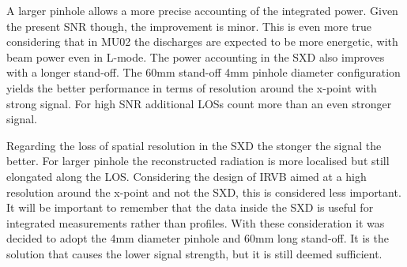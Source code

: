 A larger pinhole allows a more precise accounting of the integrated power. Given the present SNR though, the improvement is minor. This is even more true considering that in MU02 the discharges are expected to be more energetic, with beam power even in L-mode. The power accounting in the SXD also improves with a longer stand-off.
The 60mm stand-off 4mm pinhole diameter configuration yields the better performance in terms of resolution around the x-point with strong signal. For high SNR additional LOSs count more than an even stronger signal.

Regarding the loss of spatial resolution in the SXD the stonger the signal the better. For larger pinhole the reconstructed radiation is more localised but still elongated along the LOS. Considering the design of IRVB aimed at a high resolution around the x-point and not the SXD, this is considered less important. It will be important to remember that the data inside the SXD is useful for integrated measurements rather than profiles.
With these consideration it was decided to adopt the 4mm diameter pinhole and 60mm long stand-off. It is the solution that causes the lower signal strength, but it is still deemed sufficient.



